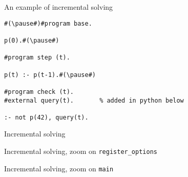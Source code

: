 \begin{frame}[fragile,c]{An example of incremental solving}
\begin{lstlisting}
#(\pause#)#program base.

p(0).#(\pause#)

#program step (t).

p(t) :- p(t-1).#(\pause#)

#program check (t).
#external query(t).       % added in python below

:- not p(42), query(t).
\end{lstlisting}
\end{frame}
\begin{frame}{Incremental solving}
  
\end{frame}
\begin{frame}{Incremental solving, zoom on \texttt{register\_options}}
  \bigskip
  
\end{frame}
\begin{frame}{Incremental solving, zoom on \texttt{main}}
  \bigskip
  
\end{frame}
%
